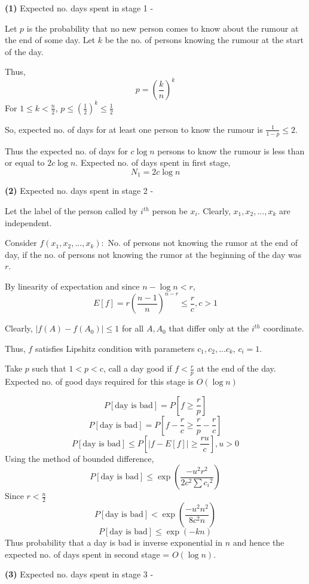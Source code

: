 \documentclass[a4paper]{article}
\begin{document}
\textbf{(1)} Expected no. days spent in stage 1 - 

Let $p$ is the probability that no new person comes to know about the rumour at the end of some day. Let $k$ be the no. of persons knowing the rumour at the start of the day.

Thus,
$$p = \left(\frac{k}{n}\right)^k$$
For $1 \leq k < \frac{n}{2}$, $p \leq \left(\frac{1}{2}\right)^k \leq \frac{1}{2}$

So, expected no. of days for at least one person to know the rumour is $\frac{1}{1 - p} \leq 2$.

Thus the expected no. of days for $c\log n$ persons to know the rumour is less than or equal to $2c\log n$.
Expected no. of days spent in first stage, $$N_1 = 2c\log n$$

\textbf{(2)} Expected no. days spent in stage 2 - 

Let the label of the person called by $i^{th}$ person be $x_i$. Clearly, $x_1,x_2,...,x_k$ are independent.

Consider $f(x_1,x_2,...,x_k) : $ No. of persons not knowing the rumor at the end of day, if the no. of persons not knowing the rumor at the beginning of the day was $r$.

By linearity of expectation and since $n - \log n < r$,
$$E[f] = r\left(\frac{n-1}{n}\right)^{n-r} \leq \frac{r}{c}, c > 1$$

Clearly, $|f(A) - f(A_0)| \leq 1$ for all $A, A_0$ that differ only at the $i^{th}$ coordinate.

Thus, $f$ satisfies Lipshitz condition with parameters $c_1,c_2,...c_k$, $c_i = 1$.

Take $p$ such that $1 < p < c$, call a day good if $f < \frac{r}{p}$ at the end of the day.
Expected no. of good days required for this stage is $O(\log n)$

$$P[\text{day is bad}] = P\left[f \geq \frac{r}{p}\right]$$
$$P[\text{day is bad}] = P\left[f - \frac{r}{c} \geq \frac{r}{p}-\frac{r}{c}\right]$$
$$P[\text{day is bad}] \leq P\left[|f - E[f]| \geq \frac{ru}{c}\right], u > 0$$
Using the method of bounded difference,
$$P[\text{day is bad}] \leq \exp\left(\frac{-u^2r^2}{2c^2\sum {c_i}^2}\right)$$
Since $r < \frac{n}{2}$
$$P[\text{day is bad}] < \exp\left(\frac{-u^2n^2}{8c^2n}\right)$$
$$P[\text{day is bad}] \leq \exp(-kn)$$
Thus probability that a day is bad is inverse exponential in $n$ and hence the expected no. of days spent in second stage = $O(\log n)$.


\textbf{(3)} Expected no. days spent in stage 3 - 
\end{document}
